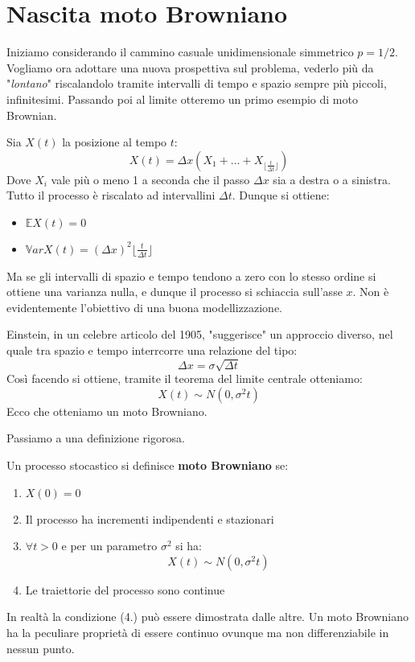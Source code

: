 \section{Nascita moto Browniano}
Iniziamo considerando il cammino casuale unidimensionale simmetrico $p=1/2$. Vogliamo ora adottare una nuova prospettiva sul problema, vederlo più da "\textit{lontano}" riscalandolo tramite intervalli di tempo e spazio sempre più piccoli, infinitesimi. Passando poi al limite otteremo un primo esempio di moto Brownian.

Sia $X(t)$ la posizione al tempo $t$:
\[X(t)=\Delta x\left(X_1+\dots+X_{\lfloor \frac{t}{\Delta t} \rfloor}\right)\]
Dove $X_i$ vale più o meno 1 a seconda che il passo $\Delta x$ sia a destra o a sinistra. Tutto il processo è riscalato ad intervallini $\Delta t$. Dunque si ottiene:
\begin{itemize}
    \item $\mathbb{E}X(t)=0$
    \item $\mathbb{V}arX(t)=\left(\Delta x\right)^2\lfloor \frac{t}{\Delta t} \rfloor$
\end{itemize}

Ma se gli intervalli di spazio e tempo tendono a zero con lo stesso ordine si ottiene una varianza nulla, e dunque il processo si schiaccia sull'asse $x$. Non è evidentemente l'obiettivo di una buona modellizzazione. 

Einstein, in un celebre articolo del 1905, "suggerisce" un approccio diverso, nel quale tra spazio e tempo interrcorre una relazione del tipo:
\[\Delta x=\sigma\sqrt{\Delta t}\]
Così facendo si ottiene, tramite il teorema del limite centrale otteniamo:
\[X(t)\sim N(0,\sigma^2t)\]
Ecco che otteniamo un moto Browniano. 

Passiamo a una definizione rigorosa.

\begin{definition}
Un processo stocastico si definisce \textbf{moto Browniano} se:
\begin{enumerate}
    \item $X(0)=0$
    \item Il processo ha incrementi indipendenti e stazionari
    \item $\forall t>0$ e per un parametro $\sigma^2$ si ha:
    \[X(t)\sim N(0,\sigma^2t)\]
    \item Le traiettorie del processo sono continue
\end{enumerate}
\end{definition}
In realtà la condizione (4.) può essere dimostrata dalle altre. Un moto Browniano ha la peculiare proprietà di essere continuo ovunque ma non differenziabile in nessun punto.

